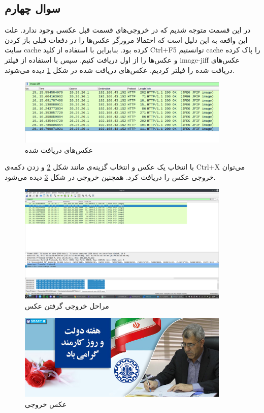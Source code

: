 \documentclass{article}
\begin{document}
\subsection{سوال چهارم}
در این قسمت متوجه شدیم که در خروجی‌های قسمت قبل عکسی وجود ندارد. علت این واقعه به این دلیل است که احتمالا مرورگر عکس‌ها را در دفعات قبلی باز کردن سایت cache کرده بود. بنابراین با استفاده از کلید Ctrl+F5 توانستیم cache را پاک کرده و عکس‌ها را از اول دریافت کنیم. سپس با استفاده از فیلتر image-jiff عکس‌های دریافت شده را فیلتر کردیم. عکس‌های دریافت شده در شکل \ref{fig:imgaes} دیده می‌شوند.
\begin{figure}[h!]
	\centering
	\includegraphics[width=0.9\textwidth]{src/image.png}
	\caption{
		عکس‌های دریافت شده
	}
	\label{fig:imgaes}
\end{figure}
با انتخاب یک عکس و انتخاب گزینه‌ی 
مانند شکل \ref{fig:imgstep} و زدن دکمه‌ی Ctrl+X می‌توان خروجی عکس را دریافت کرد. همچنین خروجی در شکل \ref{fig:extracted} دیده می‌شود.
\begin{figure}[h!]
	\centering
	\includegraphics[width=0.9\textwidth]{src/imgstep.png}
	\caption{
		مراحل خروجی گرفتن عکس
	}
	\label{fig:imgstep}
\end{figure}
\begin{figure}[h!]
	\centering
	\includegraphics[width=0.9\textwidth]{src/extracted.png}
	\caption{
		عکس خروجی
	}
	\label{fig:extracted}
\end{figure}
\end{document}
